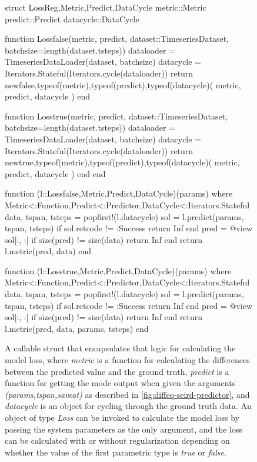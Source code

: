 \begin{figure}[!htb]
\begin{jllisting}
struct Loss{Reg,Metric,Predict,DataCycle}
    metric::Metric
    predict::Predict
    datacycle::DataCycle

    function Loss{false}(metric, predict, dataset::TimeseriesDataset,
                         batchsize=length(dataset.tsteps))
        dataloader = TimeseriesDataLoader(dataset, batchsize)
        datacycle = Iterators.Stateful(Iterators.cycle(dataloader))
        return new{false,typeof(metric),typeof(predict),typeof(datacycle)}(
            metric, predict, datacycle
        )
    end

    function Loss{true}(metric, predict, dataset::TimeseriesDataset,
                        batchsize=length(dataset.tsteps))
        dataloader = TimeseriesDataLoader(dataset, batchsize)
        datacycle = Iterators.Stateful(Iterators.cycle(dataloader))
        return new{true,typeof(metric),typeof(predict),typeof(datacycle)}(
            metric, predict, datacycle
        )
    end
end

function (l::Loss{false,Metric,Predict,DataCycle})(params)
where {Metric<:Function,Predict<:Predictor,DataCycle<:Iterators.Stateful}
    data, tspan, tsteps = popfirst!(l.datacycle)
    sol = l.predict(params, tspan, tsteps)
    if sol.retcode != :Success
        return Inf
    end
    pred = @view sol[:, :]
    if size(pred) != size(data)
        return Inf
    end
    return l.metric(pred, data)
end

function (l::Loss{true,Metric,Predict,DataCycle})(params)
where {Metric<:Function,Predict<:Predictor,DataCycle<:Iterators.Stateful}
    data, tspan, tsteps = popfirst!(l.datacycle)
    sol = l.predict(params, tspan, tsteps)
    if sol.retcode != :Success
        return Inf
    end
    pred = @view sol[:, :]
    if size(pred) != size(data)
        return Inf
    end
    return l.metric(pred, data, params, tsteps)
end
\end{jllisting}
\caption{A callable struct that encapsulates that logic for calculating the model loss, where \textit{metric} is a function for calculating the differences between the predicted value and the ground truth, \textit{predict} is a function for getting the mode output when given the arguments \textit{(params,tspan,saveat)} as described in \autoref{fig:diffeq-seird-predictor}, and \textit{datacycle} is an object for cycling through the ground truth data. An object of type \textit{Loss} can be invoked to calculate the model loss by passing the system parameters as the only argument, and the loss can be calculated with or without regularization depending on whether the value of the first parametric type is \textit{true} or \textit{false}.}
\label{fig:diffeq-seird-loss}
\end{figure}